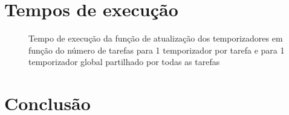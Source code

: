 \documentclass[journal]{IEEEtran}
\begin{document}
\section{Tempos de execução}

\begin{figure}
	\centering
	\resizebox{0.5\textwidth}{!}{\large }
	\caption{Tempo de execução da função de atualização dos temporizadores em função do número de tarefas para 1 temporizador por tarefa e para 1 temporizador global partilhado por todas as tarefas}
	\label{fig:timers}
\end{figure}

\section{Conclusão}
\end{document}

